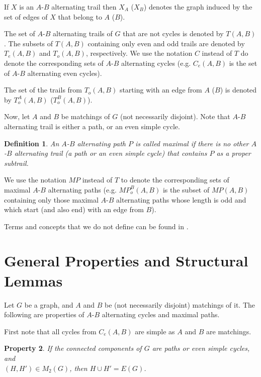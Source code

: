 \documentclass[a4paper, 12pt]{article}
\newtheorem{definition}{Definition}[section]
\newtheorem{property}[definition]{Property}
\begin{document}
If $X$ is an $A$-$B$ alternating trail then $X_A$ ($X_B$) denotes
the graph induced by the set of edges of $X$ that belong to $A$
($B$).

The set of $A$-$B$ alternating trails of $G$ that are not cycles is
denoted by $T(A,B)$. The subsets of $T(A,B)$ containing only even
and odd trails are denoted by $T_e(A,B)$ and $T_o(A,B)$,
respectively. We use the notation $C$ instead of $T$ do denote the
corresponding sets of $A$-$B$ alternating cycles (e.g. $C_e(A,B)$ is
the set of $A$-$B$ alternating even cycles).

The set of the trails from $T_o(A,B)$ starting with an edge from $A$
($B$) is denoted by $T_o^A(A,B)$ ($T_o^B(A,B)$).

Now, let $A$ and $B$ be matchings of $G$ (not necessarily disjoint).
Note that $A$-$B$ alternating trail is either a path, or an even
simple cycle.

\begin{definition}\label{max_alt_path_definition}
An $A$-$B$ alternating path $P$ is called maximal if there is no
other $A$-$B$ alternating trail (a path or an even simple cycle)
that contains $P$ as a proper subtrail.
\end{definition}

We use the notation $MP$ instead of $T$ to denote the corresponding
sets of maximal  $A$-$B$ alternating paths (e.g. $MP_o^B(A,B)$ is
the subset of $MP(A,B)$ containing only those maximal $A$-$B$
alternating paths whose length is odd and which start (and also end)
with an edge from $B$).

Terms and concepts that we do not define can be found in \cite{Har,
Lov-Plum, West}.


\section{General Properties and Structural Lemmas}

Let $G$ be a graph, and $A$ and $B$ be (not necessarily disjoint)
matchings of it. The following are properties of $A$-$B$ alternating
cycles and maximal paths.

\bigskip

First note that all cycles from $C_e(A,B)$ are simple as $A$ and $B$
are matchings.

\begin{property}\label{path_evencycle_HH'}
If the connected components of $G$ are paths or even simple cycles,
and \\ $(H, H') \in M_2(G)$, then $H \cup H' = E(G)$.
\end{property}
\end{document}
